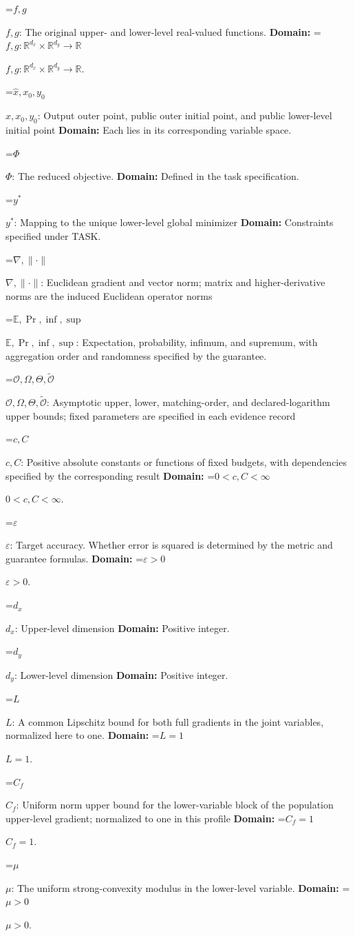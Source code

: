 \documentclass[10pt,a4paper]{article}
\newcommand{\AtlasMath}[1]{\par\begingroup\centering\setbox0=\hbox{$\displaystyle #1$}\ifdim\wd0>1.4\linewidth\typeout{ATLAS WIDE FORMULA: \the\wd0}\fi\ifdim\wd0>\linewidth\resizebox{\linewidth}{!}{\box0}\else\box0\fi\par\endgroup}
\newcommand{\AtlasInlineMath}[1]{\begingroup\setbox0=\hbox{$#1$}\ifdim\wd0>.4\linewidth\endgroup\AtlasMath{#1}\else\endgroup$#1$\fi}
\begin{document}
\AtlasInlineMath{f,g}: The original upper- and lower-level real-valued functions. \textbf{Domain:} \AtlasInlineMath{f,g:\mathbb R^{d_x}\times\mathbb R^{d_y}\to\mathbb R}.

\AtlasInlineMath{\widehat x,x_0,y_0}: Output outer point, public outer initial point, and public lower-level initial point \textbf{Domain:} Each lies in its corresponding variable space.

\AtlasInlineMath{\Phi}: The reduced objective. \textbf{Domain:} Defined in the task specification.

\AtlasInlineMath{y^*}: Mapping to the unique lower-level global minimizer \textbf{Domain:} Constraints specified under TASK.

\AtlasInlineMath{\nabla,\|\cdot\|}: Euclidean gradient and vector norm; matrix and higher-derivative norms are the induced Euclidean operator norms

\AtlasInlineMath{\mathbb E,\Pr,\inf,\sup}: Expectation, probability, infimum, and supremum, with aggregation order and randomness specified by the guarantee.

\AtlasInlineMath{\mathcal O,\Omega,\Theta,\widetilde{\mathcal O}}: Asymptotic upper, lower, matching-order, and declared-logarithm upper bounds; fixed parameters are specified in each evidence record

\AtlasInlineMath{c,C}: Positive absolute constants or functions of fixed budgets, with dependencies specified by the corresponding result \textbf{Domain:} \AtlasInlineMath{0<c,C<\infty}.

\AtlasInlineMath{\varepsilon}: Target accuracy. Whether error is squared is determined by the metric and guarantee formulas. \textbf{Domain:} \AtlasInlineMath{\varepsilon>0}.

\AtlasInlineMath{d_x}: Upper-level dimension \textbf{Domain:} Positive integer.

\AtlasInlineMath{d_y}: Lower-level dimension \textbf{Domain:} Positive integer.

\AtlasInlineMath{L}: A common Lipschitz bound for both full gradients in the joint variables, normalized here to one. \textbf{Domain:} \AtlasInlineMath{L=1}.

\AtlasInlineMath{C_f}: Uniform norm upper bound for the lower-variable block of the population upper-level gradient; normalized to one in this profile \textbf{Domain:} \AtlasInlineMath{C_f=1}.

\AtlasInlineMath{\mu}: The uniform strong-convexity modulus in the lower-level variable. \textbf{Domain:} \AtlasInlineMath{\mu>0}.
\end{document}
